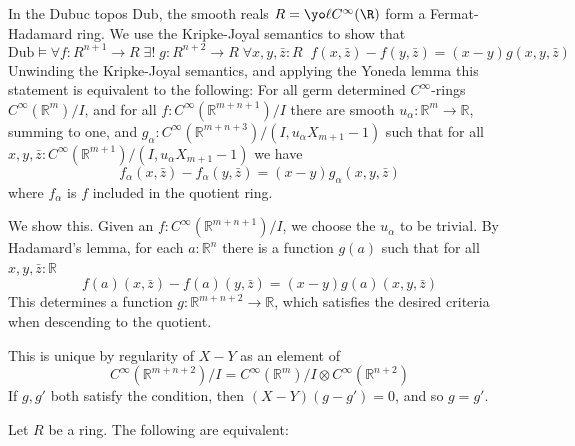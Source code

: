 {\begin{example}
  In the Dubuc topos \(\mathrm{Dub}\), the smooth reals \(R = \yo \ell C^\infty(\R)\) form a Fermat-Hadamard ring.
  We use the Kripke-Joyal semantics to show that 
  \[ \mathrm{Dub} \models \forall f : R^{n+1} \to R \; 
                          \exists ! \; g : R^{n+2} \to R  \;
                          \forall x, y , \bar{z}  : R \; \;
                           f(x, \bar{z}) - f(y, \bar{z}) = (x-y)g(x,y,\bar{z})\]
  Unwinding the Kripke-Joyal semantics, and applying the Yoneda lemma this statement is equivalent to the following:
  For all germ determined \(C^\infty\)-rings \(C^\infty(\mathbb{R}^m)/I\), and for all \(f : C^{\infty}(\mathbb{R}^{m+n+1})/I\) there are smooth \(u_{\alpha}: \mathbb{R}^{m}\to \mathbb{R}\), summing to one, 
  and \(g_{\alpha}: C^\infty(\mathbb{R}^{m+n+3})/(I, u_{\alpha}X_{m+1}-1)\) such that for all \(x,y,\bar z : C^\infty(\mathbb{R}^{m+1})/(I, u_{\alpha}X_{m+1}-1)\) we have 
  \[f_\alpha(x, \bar{z}) - f_\alpha(y, \bar{z}) = (x-y)g_\alpha(x,y,\bar{z})\] 
  where \(f_\alpha\) is \(f\) included in the quotient ring.

We show this. Given an \(f : C^\infty(\mathbb{R}^{m+n+1})/I\), we choose the \(u_\alpha\) to be trivial.
By Hadamard's lemma, for each \(a : \mathbb{R}^n\) there is a function \(g(a)\) such that for all \(x, y, \bar{z} : \mathbb{R}\) 
\[f(a)(x, \bar{z}) - f(a)(y, \bar{z}) = (x-y)g(a)(x,y,\bar{z})\]
This determines a function \(g : \mathbb{R}^{m+n+2} \to \mathbb{R}\), which satisfies the desired criteria when descending to the quotient.

This is unique by regularity of \(X-Y\) as an element of \[C^\infty(\mathbb{R}^{m+n+2})/I = C^\infty(\mathbb{R}^m)/I \otimes C^\infty(\mathbb{R}^{n+2})\]
If $g, g'$ both satisfy the condition, then $(X-Y)(g-g') = 0$, and so $g = g'$.
\end{example}

\begin{proposition}
  \label{prop:fermat-ring-quotients}
  Let \(R\) be a ring.
  The following are equivalent:


\end{proposition}}
